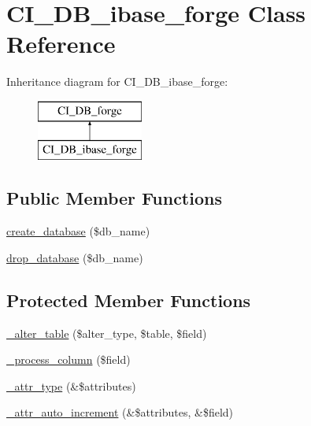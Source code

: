 \hypertarget{class_c_i___d_b__ibase__forge}{}\section{C\+I\+\_\+\+D\+B\+\_\+ibase\+\_\+forge Class Reference}
\label{class_c_i___d_b__ibase__forge}
Inheritance diagram for C\+I\+\_\+\+D\+B\+\_\+ibase\+\_\+forge\+:\begin{figure}[H]
\begin{center}
\leavevmode
\includegraphics[height=2.000000cm]{class_c_i___d_b__ibase__forge}
\end{center}
\end{figure}
\subsection*{Public Member Functions}
\begin{DoxyCompactItemize}
\item 
\mbox{\hyperlink{class_c_i___d_b__ibase__forge_a902a7267babceb2ce595706f217e00ad}{create\+\_\+database}} (\$db\+\_\+name)
\item 
\mbox{\hyperlink{class_c_i___d_b__ibase__forge_a9612987b2d4230de2638d15857e92e67}{drop\+\_\+database}} (\$db\+\_\+name)
\end{DoxyCompactItemize}
\subsection*{Protected Member Functions}
\begin{DoxyCompactItemize}
\item 
\mbox{\hyperlink{class_c_i___d_b__ibase__forge_a41c6cae02f2fda8b429ad0afb9509426}{\+\_\+alter\+\_\+table}} (\$alter\+\_\+type, \$table, \$field)
\item 
\mbox{\hyperlink{class_c_i___d_b__ibase__forge_a8f38f1c5b5dddecca4befbe393f3f299}{\+\_\+process\+\_\+column}} (\$field)
\item 
\mbox{\hyperlink{class_c_i___d_b__ibase__forge_a8553be952084c6f7cdfff370a1d14f6b}{\+\_\+attr\+\_\+type}} (\&\$attributes)
\item 
\mbox{\hyperlink{class_c_i___d_b__ibase__forge_a2a013a5932439c3c44f0dad3436525f7}{\+\_\+attr\+\_\+auto\+\_\+increment}} (\&\$attributes, \&\$field)
\end{DoxyCompactItemize}
